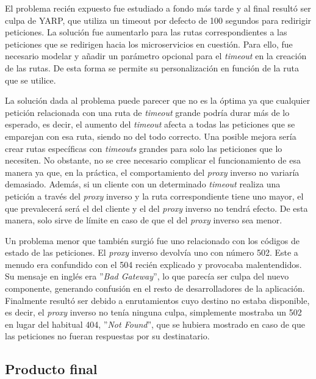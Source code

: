 \documentclass[11pt,spanish,listoffigures]{tfgetsinf}
\begin{document}
El problema recién expuesto fue estudiado a fondo más tarde y al final resultó ser culpa de YARP, que utiliza un timeout por defecto de 100 segundos para redirigir peticiones. La solución fue aumentarlo para las rutas correspondientes a las peticiones que se redirigen hacia los microservicios en cuestión. Para ello, fue necesario modelar y añadir un parámetro opcional para el \emph{timeout} en la creación de las rutas. De esta forma se permite su personalización en función de la ruta que se utilice.

La solución dada al problema puede parecer que no es la óptima ya que cualquier petición relacionada con una ruta de \emph{timeout} grande podría durar más de lo esperado, es decir, el aumento del \emph{timeout} afecta a todas las peticiones que se emparejan con esa ruta, siendo no del todo correcto. Una posible mejora sería crear rutas específicas con \emph{timeouts} grandes para solo las peticiones que lo necesiten. No obstante, no se cree necesario complicar el funcionamiento de esa manera ya que, en la práctica, el comportamiento del \emph{proxy} inverso no variaría demasiado. Además, si un cliente con un determinado \emph{timeout} realiza una petición a través del \emph{proxy} inverso y la ruta correspondiente tiene uno mayor, el que prevalecerá será el del cliente y el del \emph{proxy} inverso no tendrá efecto. De esta manera, solo sirve de límite en caso de que el del \emph{proxy} inverso sea menor.

Un problema menor que también surgió fue uno relacionado con los códigos de estado de las peticiones. El \emph{proxy} inverso devolvía uno con número 502. Este a menudo era confundido con el 504 recién explicado y provocaba malentendidos. Su mensaje en inglés era ''\emph{Bad Gateway}'', lo que parecía ser culpa del nuevo componente, generando confusión en el resto de desarrolladores de la aplicación. Finalmente resultó ser debido a enrutamientos cuyo destino no estaba disponible, es decir, el \emph{proxy} inverso no tenía ninguna culpa, simplemente mostraba un 502 en lugar del habitual 404, ''\emph{Not Found}'', que se hubiera mostrado en caso de que las peticiones no fueran respuestas por su destinatario.


		\subsection{Producto final}
\end{document}
